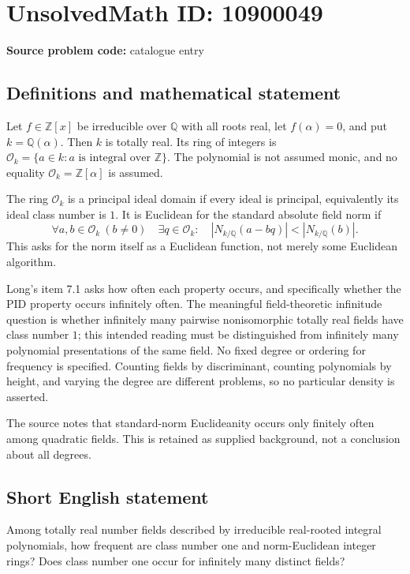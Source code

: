 \documentclass[11pt]{article}
\newcommand{\Z}{\mathbb{Z}}
\newcommand{\Q}{\mathbb{Q}}
\begin{document}
\section*{UnsolvedMath ID: 10900049}
\textbf{Source problem code:} catalogue entry
\subsection{Definitions and mathematical statement}
Let $f\in\Z[x]$ be irreducible over $\Q$ with all roots real, let $f(\alpha)=0$, and put $k=\Q(\alpha)$. Then $k$ is totally real. Its ring of integers is $\mathcal O_k=\{a\in k:a\text{ is integral over }\Z\}$. The polynomial is not assumed monic, and no equality $\mathcal O_k=\Z[\alpha]$ is assumed.

The ring $\mathcal O_k$ is a principal ideal domain if every ideal is principal, equivalently its ideal class number is $1$. It is Euclidean for the standard absolute field norm if
\[
 \forall a,b\in\mathcal O_k\ (b\ne0)\quad
 \exists q\in\mathcal O_k:\quad
 |N_{k/\Q}(a-bq)|<|N_{k/\Q}(b)|.
\]
This asks for the norm itself as a Euclidean function, not merely some Euclidean algorithm.

Long's item 7.1 asks how often each property occurs, and specifically whether the PID property occurs infinitely often. The meaningful field-theoretic infinitude question is whether infinitely many pairwise nonisomorphic totally real fields have class number $1$; this intended reading must be distinguished from infinitely many polynomial presentations of the same field. No fixed degree or ordering for frequency is specified. Counting fields by discriminant, counting polynomials by height, and varying the degree are different problems, so no particular density is asserted.

The source notes that standard-norm Euclideanity occurs only finitely often among quadratic fields. This is retained as supplied background, not a conclusion about all degrees.
\subsection{Short English statement}
Among totally real number fields described by irreducible real-rooted integral polynomials, how frequent are class number one and norm-Euclidean integer rings? Does class number one occur for infinitely many distinct fields?
\end{document}
